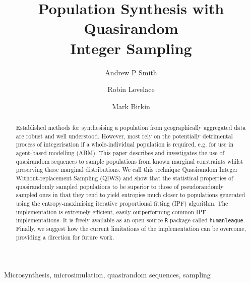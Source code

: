 \documentclass{JASSS}
\title{Population Synthesis with Quasirandom \\Integer Sampling}
\author[1]{Andrew P Smith}
\author[1]{Robin Lovelace}
\author[1]{Mark Birkin}
\affil[1]{University of Leeds}
\begin{document}
\maketitle 



\begin{abstract}
Established methods for synthesising a population from geographically
aggregated data are robust and well understood. However, most rely on
the potentially detrimental process of integerisation if a
whole-individual population is required, e.g. for use in agent-based
modelling (ABM). This paper describes and investigates the use of quasirandom sequences to sample 
populations from known marginal constraints whilst preserving those marginal distributions.
We call this technique Quasirandom Integer Without-replacement Sampling (QIWS) and show that the statistical properties of quasirandomly sampled populations to be superior to those of pseudorandomly sampled ones in that they tend to yield entropies much closer to populations generated using the entropy-maximising iterative proportional fitting (IPF) algorithm. The implementation is extremely efficient, easily outperforming common IPF implementations. It is freely available as an open source \texttt{R} package called \texttt{humanleague}. Finally, we suggest how the current limitations of the implementation can be overcome, providing a direction for future work.
\end{abstract}

\begin{keywords}
Microsynthesis, microsimulation, quasirandom sequences, sampling
\end{keywords}

\parano{}



\end{document}
